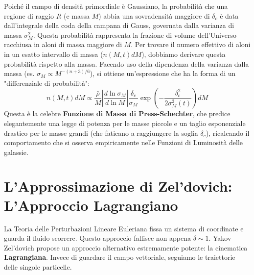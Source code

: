 \documentclass[11pt,a4paper]{report}
\begin{document}
Poiché il campo di densità primordiale è Gaussiano, la probabilità che una regione di raggio $R$ (e massa $M$) abbia una sovradensità maggiore di $\delta_c$ è data dall'integrale della coda della campana di Gauss, governata dalla varianza di massa $\sigma_M^2$.
Questa probabilità rappresenta la frazione di volume dell'Universo racchiusa in aloni di massa maggiore di $M$. 
Per trovare il numero effettivo di aloni in un esatto intervallo di massa ($n(M, t) dM$), dobbiamo derivare questa probabilità rispetto alla massa. Facendo uso della dipendenza della varianza dalla massa (es. $\sigma_M \propto M^{-(n+3)/6}$), si ottiene un'espressione che ha la forma di un "differenziale di probabilità":
\begin{equation}
n(M, t) dM \propto \frac{\bar{\rho}}{M} \left| \frac{d \ln \sigma_M}{d \ln M} \right| \frac{\delta_c}{\sigma_M} \exp\left( - \frac{\delta_c^2}{2\sigma_M^2(t)} \right) dM
\end{equation}
Questa è la celebre \textbf{Funzione di Massa di Press-Schechter}, che predice elegantemente una legge di potenza per le masse piccole e un taglio esponenziale drastico per le masse grandi (che faticano a raggiungere la soglia $\delta_c$), ricalcando il comportamento che si osserva empiricamente nelle Funzioni di Luminosità delle galassie.

\section{L'Approssimazione di Zel'dovich: L'Approccio Lagrangiano}

La Teoria delle Perturbazioni Lineare Euleriana fissa un sistema di coordinate e guarda il fluido scorrere. Questo approccio fallisce non appena $\delta \sim 1$.
Yakov Zel'dovich propose un approccio alternativo estremamente potente: la cinematica \textbf{Lagrangiana}. Invece di guardare il campo vettoriale, seguiamo le traiettorie delle singole particelle.
\end{document}
